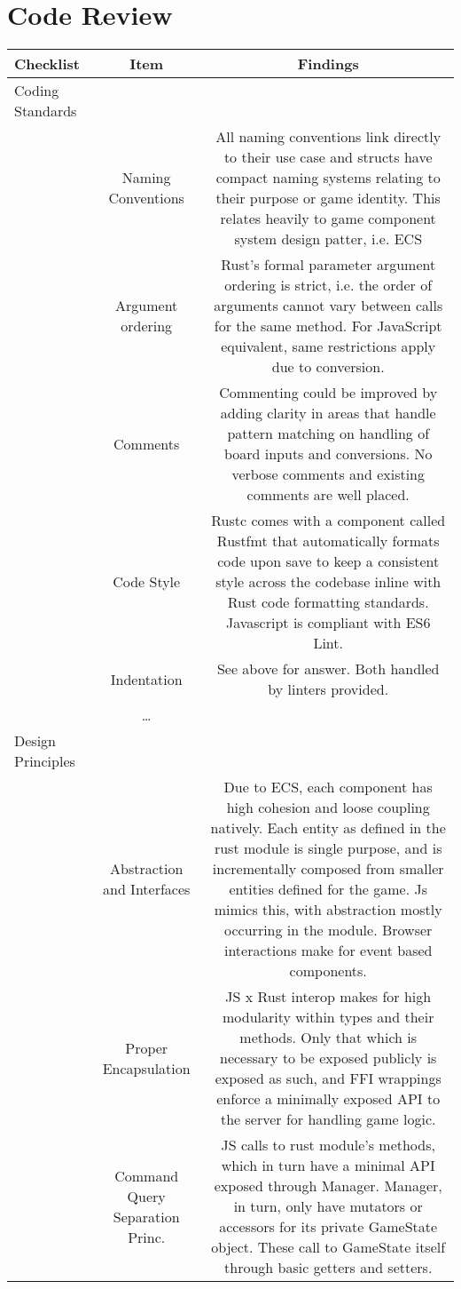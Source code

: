 \documentclass[11pt]{article}
\begin{document}
\section{Code Review}
\label{sec:orgf1105e1}
\begin{center}
\begin{tabular}{|l|c|c|}
Checklist & Item & Findings\\
\hline
Coding Standards &  & \\
\hline
 & Naming Conventions & All naming conventions link directly to their use case and structs have compact naming systems relating to their purpose or game identity. This relates heavily to game component system design patter, i.e. ECS\\
 & Argument ordering & Rust's formal parameter argument ordering is strict, i.e. the order of arguments cannot vary between calls for the same method. For JavaScript equivalent, same restrictions apply due to conversion.\\
 & Comments & Commenting could be improved by adding clarity in areas that handle pattern matching on handling of board inputs and conversions. No verbose comments and existing comments are well placed.\\
 & Code Style & Rustc comes with a component called Rustfmt that automatically formats code upon save to keep a consistent style across the codebase inline with Rust code formatting standards. Javascript is compliant with ES6 Lint.\\
 & Indentation & See above for answer. Both handled by linters provided.\\
 & \ldots{} & \\
\hline
Design Principles &  & \\
\hline
 & Abstraction and Interfaces & Due to ECS, each component has high cohesion and loose coupling natively. Each entity as defined in the rust module is single purpose, and is incrementally composed from smaller entities defined for the game. Js mimics this, with abstraction mostly occurring in the module. Browser interactions make for event based components.\\
 & Proper Encapsulation & JS x Rust interop makes for high modularity within types and their methods. Only that which is necessary to be exposed publicly is exposed as such, and FFI wrappings enforce a minimally exposed API to the server for handling game logic.\\
 & Command Query Separation Princ. & JS calls to rust module's methods, which in turn have a minimal API exposed through Manager. Manager, in turn, only have mutators or accessors for its private GameState object. These call to GameState itself through basic getters and setters.\\

\end{tabular}
\end{center}
\end{document}
